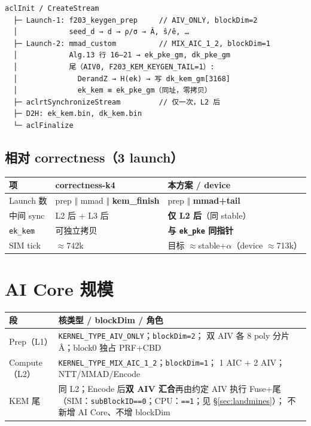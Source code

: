 \documentclass[UTF8,a4paper,11pt]{ctexart}
\begin{document}
\begin{verbatim}
aclInit / CreateStream
  ├─ Launch-1: f203_keygen_prep     // AIV_ONLY, blockDim=2
  │            seed_d → d → ρ/σ → Â, ŝ/ê, …
  ├─ Launch-2: mmad_custom          // MIX_AIC_1_2, blockDim=1
  │            Alg.13 行 16–21 → ek_pke_gm, dk_pke_gm
  │            尾（AIV0, F203_KEM_KEYGEN_TAIL=1）:
  │              DerandZ → H(ek) → 写 dk_kem_gm[3168]
  │              ek_kem ≡ ek_pke_gm（同址，零拷贝）
  ├─ aclrtSynchronizeStream         // 仅一次，L2 后
  ├─ D2H: ek_kem.bin, dk_kem.bin
  └─ aclFinalize
\end{verbatim}

\subsection{相对 correctness（3 launch）}

\begin{longtable}{@{}L{3.2cm}L{4.8cm}L{4.8cm}@{}}
\toprule
项 & correctness-k4 & \textbf{本方案 / device} \\
\midrule
Launch 数 & prep $\Vert$ mmad $\Vert$ \textbf{kem\_finish} & prep $\Vert$ \textbf{mmad+tail} \\
中间 sync & L2 后 + L3 后 & \textbf{仅 L2 后}（同 stable） \\
\texttt{ek\_kem} & 可独立拷贝 & \textbf{与 \texttt{ek\_pke} 同指针} \\
SIM tick & $\approx$742k & 目标 $\approx$stable$+\alpha$（device $\approx$713k） \\
\bottomrule
\end{longtable}

\section{AI Core 规模}
\label{sec:aicore}

\begin{longtable}{@{}L{3.2cm}L{10cm}@{}}
\toprule
段 & 核类型 / blockDim / 角色 \\
\midrule
Prep（L1） & \texttt{KERNEL\_TYPE\_AIV\_ONLY}；\texttt{blockDim=2}；
             双 AIV 各 8 poly 分片 \^A；block0 独占 PRF+CBD \\
Compute（L2） & \texttt{KERNEL\_TYPE\_MIX\_AIC\_1\_2}；\texttt{blockDim=1}；
                1 AIC + 2 AIV；NTT/MMAD/Encode \\
KEM 尾 & 同 L2；Encode 后\textbf{双 AIV 汇合}再由约定 AIV 执行 Fuse+尾
         （SIM：\texttt{subBlockID==0}；CPU：\texttt{==1}；见 \S\ref{sec:landmines}）；
         不新增 AI Core、不增 blockDim \\
\bottomrule
\end{longtable}
\end{document}
